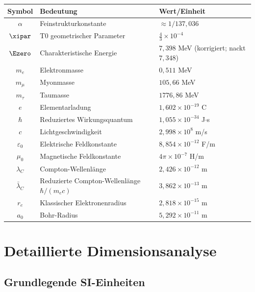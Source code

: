 	\begin{longtable}{|c|l|l|}
		\hline
		\textbf{Symbol} & \textbf{Bedeutung} & \textbf{Wert/Einheit} \\
		\hline
		$\alpha$ & Feinstrukturkonstante & $\approx 1/137{,}036$ \\
		$\xipar$ & T0 geometrischer Parameter & $\frac{4}{3} \times 10^{-4}$ \\
		$\Ezero$ & Charakteristische Energie & $7{,}398$ MeV (korrigiert; nackt $7{,}348$) \\
		$m_e$ & Elektronmasse & $0{,}511$ MeV \\
		$m_\mu$ & Myonmasse & $105{,}66$ MeV \\
		$m_\tau$ & Taumasse & $1776{,}86$ MeV \\
		$e$ & Elementarladung & $1{,}602 \times 10^{-19}$ C \\
		$\hbar$ & Reduziertes Wirkungsquantum & $1{,}055 \times 10^{-34}$ J$\cdot$s \\
		$c$ & Lichtgeschwindigkeit & $2{,}998 \times 10^8$ m/s \\
		$\varepsilon_0$ & Elektrische Feldkonstante & $8{,}854 \times 10^{-12}$ F/m \\
		$\mu_0$ & Magnetische Feldkonstante & $4\pi \times 10^{-7}$ H/m \\
		$\lambda_C$ & Compton-Wellenlänge & $2{,}426 \times 10^{-12}$ m \\
		$\bar\lambda_C$ & Reduzierte Compton-Wellenlänge $\hbar/(m_e c)$ & $3{,}862 \times 10^{-13}$ m \\
		$r_e$ & Klassischer Elektronenradius & $2{,}818 \times 10^{-15}$ m \\
		$a_0$ & Bohr-Radius & $5{,}292 \times 10^{-11}$ m \\
		\hline
	\end{longtable}
	
	
	\appendix
	
	\section{Detaillierte Dimensionsanalyse}
	\label{app:dimensional_analysis}
	
	\subsection{Grundlegende SI-Einheiten}
	
